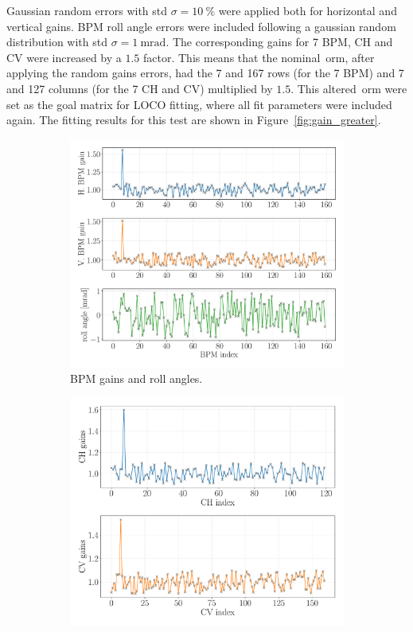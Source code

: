 Gaussian random errors with std $\sigma=\SI{10}{\%}$ were applied both for horizontal and vertical gains. BPM roll angle errors were included following a gaussian random distribution with std $\sigma=\SI{1}{\milli\radian}$.  The corresponding gains for 7 BPM, CH and CV were increased by a $1.5$ factor. This means that the nominal~\gls{orm}, after applying the random gains errors, had the 7 and 167 rows (for the 7 BPM) and 7 and 127 columns (for the 7 CH and CV) multiplied by $1.5$. This altered~\gls{orm} were set as the goal matrix for LOCO fitting, where all fit parameters were included again. The fitting results for this test are shown in Figure~\ref{fig:gain_greater}.
\begin{figure}
\centering
\begin{subfigure}[t]{0.49\textwidth}
\includegraphics[width=1.0\textwidth]{figures/bpm_gains_1p5gain_7th_bpm_grid_big.pdf}
    \caption{BPM gains and roll angles.}
    \label{subfig:bpm_fit_gain_greater}
\end{subfigure}
 \begin{subfigure}[t]{0.49\textwidth}
\includegraphics[width=1.0\textwidth]{figures/corr_gains_chcv_1p5_grid_big.pdf}

\end{subfigure}
\end{figure}
